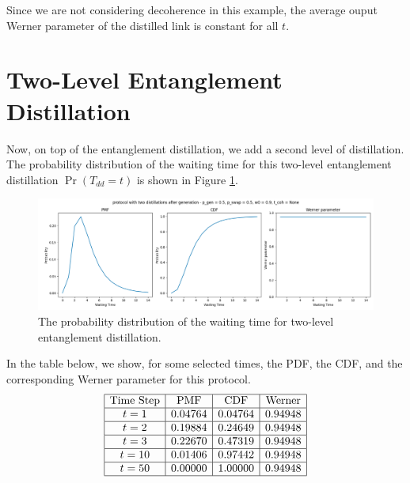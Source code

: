 \documentclass{masterthesis}
\begin{document}
Since we are not considering decoherence in this example, the average ouput Werner parameter of the distilled link is constant for all $t$.

\section*{Two-Level Entanglement Distillation}

Now, on top of the entanglement distillation, we add a second level of distillation. The probability distribution of the waiting time for this two-level entanglement distillation $\Pr(T_{dd} = t)$ is shown in Figure \ref{fig:two_level_distillation_waiting_time}.

\begin{figure}[ht]
    \centering
    \includegraphics[width=1\linewidth]{images/dist_tests/two distillations after generation.png}
    \caption{The probability distribution of the waiting time for two-level entanglement distillation.}
    \label{fig:two_level_distillation_waiting_time}
\end{figure}

In the table below, we show, for some selected times, the PDF, the CDF, and the corresponding Werner parameter for this protocol.
\begin{equation*}
    \begin{array}{|c|c|c|c|}
        \hline
        \text{Time Step} & \text{PMF} & \text{CDF} & \text{Werner} \\
        \hline
        t = 1 & 0.04764 & 0.04764 & 0.94948 \\
        \hline
        t = 2 & 0.19884 & 0.24649 & 0.94948 \\
        \hline
        t = 3 & 0.22670 & 0.47319 & 0.94948 \\
        \hline
        t = 10 & 0.01406 & 0.97442 & 0.94948 \\
        \hline
        t = 50 & 0.00000 & 1.00000 & 0.94948 \\
        \hline
    \end{array}
\end{equation*}
\end{document}

